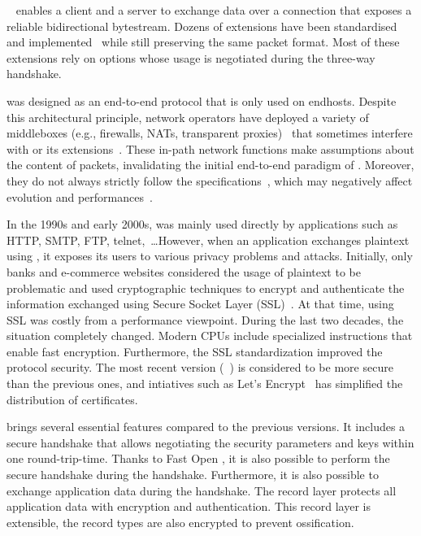 
\tcp~\cite{rfc793} enables a client and a server to exchange data
over a connection that exposes a reliable bidirectional bytestream.
Dozens of \tcp extensions have been standardised and implemented~\cite{RFC7414}
while still preserving the same packet format. Most of these extensions rely on
\tcp options whose usage is negotiated during the three-way handshake.

\tcp was designed as an end-to-end protocol that is only used on endhosts.
Despite this architectural principle, network operators have deployed a variety
of middleboxes (e.g., firewalls, NATs, transparent proxies)~\cite{mCloud} that
sometimes interfere with \tcp or its extensions~\cite{medina2004measuring,
honda2011still, edeline2019bottom}. These in-path network functions make
assumptions about the content of \tcp packets, invalidating the initial
end-to-end paradigm of \tcp. Moreover, they do not always strictly follow the
\tcp specifications~\cite{honda2011still, hesmans2013tcp}, which may negatively
affect \tcp evolution and performances~\cite{edeline2020evaluating}.


In the 1990s and early 2000s, \tcp was mainly used directly by applications such
as HTTP, SMTP, FTP, telnet,~\ldots However, when an application exchanges
plaintext using \tcp, it exposes its users to various privacy problems and
attacks. Initially, only banks and e-commerce websites considered the usage of
plaintext to be problematic and used cryptographic techniques to encrypt and
authenticate the information exchanged using Secure Socket Layer
(SSL)~\cite{draft-hickman-netscape-ssl}. At that time, using SSL was costly from
a performance viewpoint. During the last two decades, the situation completely
changed. Modern CPUs include specialized instructions that enable fast
encryption. Furthermore, the SSL standardization improved the protocol security.
The most recent version (~\cite{rfc8446}) is considered to be more
secure than the previous ones, and intiatives such as Let's Encrypt~\cite{aas2019let} has
simplified the distribution of certificates.

 brings several essential features compared to the previous versions. It
includes a secure handshake that allows negotiating the security parameters and
keys within one round-trip-time. Thanks to \tcp Fast Open
\cite{radhakrishnan2011tcp}, it is also possible to perform the secure handshake
during the \tcp handshake. Furthermore, it is also possible to exchange
application data during the handshake. The  record layer protects all
application data with encryption and authentication. This record layer is
extensible, the \tls record types are also
encrypted to prevent ossification.

